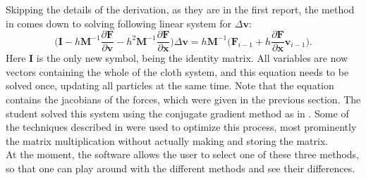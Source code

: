 Skipping the details of the derivation, as they are in the first report, the method in  \cite{baraff_implicit} comes down to solving following linear system for $\Delta \textbf{v}$:
\begin{equation}\label{system}
\Big(\textbf{I} - h\textbf{M}^{-1}\frac{\partial \textbf{F}}{\partial \textbf{v}}-h^2\textbf{M}^{-1}\frac{\partial \textbf{F}}{\partial \textbf{x}} \Big) \Delta \textbf{v} = h\textbf{M}^{-1} \Big( \textbf{F}_{i-1} + h \frac{\partial \textbf{F}}{\partial \textbf{x}} \textbf{v}_{i-1} \Big).
\end{equation}
Here $\textbf{I}$ is the only new symbol, being the identity matrix. All variables are now vectors containing the whole of the cloth system, and this equation needs to be solved once, updating all particles at the same time. Note that the equation contains the jacobians of the forces, which were given in the previous section. The student solved this system using the conjugate gradient method as in \cite[chap. 38]{numerical_algebra}. Some of the techniques described in \citep{volino_matrix_free} were used to optimize this process, most prominently the matrix multiplication without actually making and storing the matrix.\\

At the moment, the software allows the user to select one of these three methods, so that one can play around with the different methods and see their differences.\\



\ifx\isEmbedded\undefined


\pagebreak

\fi